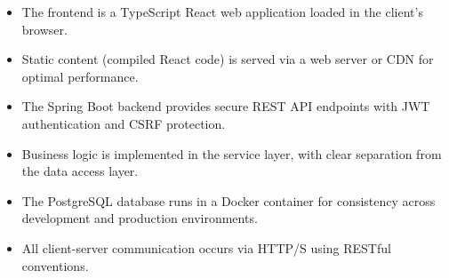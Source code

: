 \documentclass[a4paper,10pt]{article}
\begin{document}
            \begin{itemize}
                \item The frontend is a TypeScript React web application loaded in the client's browser.
                \item Static content (compiled React code) is served via a web server or CDN for optimal performance.
                \item The Spring Boot backend provides secure REST API endpoints with JWT authentication and CSRF protection.
                \item Business logic is implemented in the service layer, with clear separation from the data access layer.
                \item The PostgreSQL database runs in a Docker container for consistency across development and production environments.
                \item All client-server communication occurs via HTTP/S using RESTful conventions.
            \end{itemize}
\end{document}
